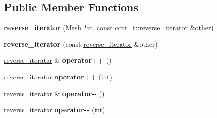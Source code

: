 \subsection*{Public Member Functions}
\begin{DoxyCompactItemize}
\item 
\hypertarget{classINMOST_1_1ElementArray_1_1reverse__iterator_a31626bef2bdce5c06744ef82c215d815}{{\bfseries reverse\-\_\-iterator} (\hyperlink{classINMOST_1_1Mesh}{Mesh} $\ast$m, const cont\-\_\-t\-::reverse\-\_\-iterator \&other)}\label{classINMOST_1_1ElementArray_1_1reverse__iterator_a31626bef2bdce5c06744ef82c215d815}

\item 
\hypertarget{classINMOST_1_1ElementArray_1_1reverse__iterator_a35aeb6a3511335494e5cec02e7dfd2dd}{{\bfseries reverse\-\_\-iterator} (const \hyperlink{classINMOST_1_1ElementArray_1_1reverse__iterator}{reverse\-\_\-iterator} \&other)}\label{classINMOST_1_1ElementArray_1_1reverse__iterator_a35aeb6a3511335494e5cec02e7dfd2dd}

\item 
\hypertarget{classINMOST_1_1ElementArray_1_1reverse__iterator_aa7141990b0eb273db9b93f47a1238acb}{\hyperlink{classINMOST_1_1ElementArray_1_1reverse__iterator}{reverse\-\_\-iterator} \& {\bfseries operator++} ()}\label{classINMOST_1_1ElementArray_1_1reverse__iterator_aa7141990b0eb273db9b93f47a1238acb}

\item 
\hypertarget{classINMOST_1_1ElementArray_1_1reverse__iterator_addc4d8af50494b40947ec19ff4259bc3}{\hyperlink{classINMOST_1_1ElementArray_1_1reverse__iterator}{reverse\-\_\-iterator} {\bfseries operator++} (int)}\label{classINMOST_1_1ElementArray_1_1reverse__iterator_addc4d8af50494b40947ec19ff4259bc3}

\item 
\hypertarget{classINMOST_1_1ElementArray_1_1reverse__iterator_acd1a26fff5ef7b466cc9357e77207cb5}{\hyperlink{classINMOST_1_1ElementArray_1_1reverse__iterator}{reverse\-\_\-iterator} \& {\bfseries operator-\/-\/} ()}\label{classINMOST_1_1ElementArray_1_1reverse__iterator_acd1a26fff5ef7b466cc9357e77207cb5}

\item 
\hypertarget{classINMOST_1_1ElementArray_1_1reverse__iterator_ac2f1741086eeedb85d9b2d75e0b2a65b}{\hyperlink{classINMOST_1_1ElementArray_1_1reverse__iterator}{reverse\-\_\-iterator} {\bfseries operator-\/-\/} (int)}\label{classINMOST_1_1ElementArray_1_1reverse__iterator_ac2f1741086eeedb85d9b2d75e0b2a65b}


\end{DoxyCompactItemize}
